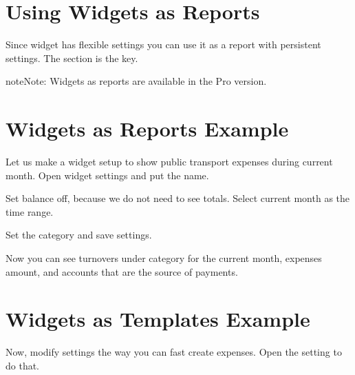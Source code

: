 \documentclass[a4paper,10pt,english]{sphinxmanual}
\begin{document}
\section{Using Widgets as Reports}
\label{\detokenize{widgets:using-widgets-as-reports}}
\sphinxAtStartPar
Since widget has flexible settings you can use it as a report with persistent settings. The
 section is the key.

\begin{sphinxadmonition}{note}{Note:}
\sphinxAtStartPar
Widgets as reports are available in the Pro version.
\end{sphinxadmonition}


\section{Widgets as Reports Example}
\label{\detokenize{widgets:widgets-as-reports-example}}
\sphinxAtStartPar
Let us make a widget setup to show public transport expenses during current month.
Open widget settings and put the  name.

\noindent{}
\noindent{}
\noindent{}

\sphinxAtStartPar
Set balance off, because we do not need to see totals. Select current month as the time range.

\noindent{}
\noindent{}
\noindent{}

\sphinxAtStartPar
Set the  category and save settings.

\noindent{}

\sphinxAtStartPar
Now you can see turnovers under  category for the current month,
expenses amount, and accounts that are the source of payments.


\section{Widgets as Templates Example}
\label{\detokenize{widgets:widgets-as-templates-example}}
\sphinxAtStartPar
Now, modify settings the way you can fast create expenses. Open the setting to do that.
\end{document}

